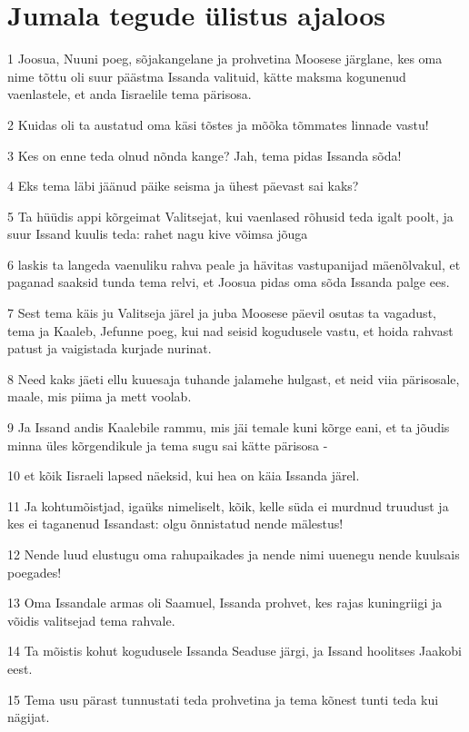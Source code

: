 \section*{Jumala tegude ülistus ajaloos}

\par 1 Joosua, Nuuni poeg, sõjakangelane ja prohvetina Moosese järglane, kes oma nime tõttu oli suur päästma Issanda valituid, kätte maksma kogunenud vaenlastele, et anda Iisraelile tema pärisosa.
\par 2 Kuidas oli ta austatud oma käsi tõstes ja mõõka tõmmates linnade vastu!
\par 3 Kes on enne teda olnud nõnda kange? Jah, tema pidas Issanda sõda!
\par 4 Eks tema läbi jäänud päike seisma ja ühest päevast sai kaks?
\par 5 Ta hüüdis appi kõrgeimat Valitsejat, kui vaenlased rõhusid teda igalt poolt, ja suur Issand kuulis teda: rahet nagu kive võimsa jõuga
\par 6 laskis ta langeda vaenuliku rahva peale ja hävitas vastupanijad mäenõlvakul, et paganad saaksid tunda tema relvi, et Joosua pidas oma sõda Issanda palge ees.
\par 7 Sest tema käis ju Valitseja järel ja juba Moosese päevil osutas ta vagadust, tema ja Kaaleb, Jefunne poeg, kui nad seisid kogudusele vastu, et hoida rahvast patust ja vaigistada kurjade nurinat.
\par 8 Need kaks jäeti ellu kuuesaja tuhande jalamehe hulgast, et neid viia pärisosale, maale, mis piima ja mett voolab.
\par 9 Ja Issand andis Kaalebile rammu, mis jäi temale kuni kõrge eani, et ta jõudis minna üles kõrgendikule ja tema sugu sai kätte pärisosa -
\par 10 et kõik Iisraeli lapsed näeksid, kui hea on käia Issanda järel.
\par 11 Ja kohtumõistjad, igaüks nimeliselt, kõik, kelle süda ei murdnud truudust ja kes ei taganenud Issandast: olgu õnnistatud nende mälestus!
\par 12 Nende luud elustugu oma rahupaikades ja nende nimi uuenegu nende kuulsais poegades!
\par 13 Oma Issandale armas oli Saamuel, Issanda prohvet, kes rajas kuningriigi ja võidis valitsejad tema rahvale.
\par 14 Ta mõistis kohut kogudusele Issanda Seaduse järgi, ja Issand hoolitses Jaakobi eest.
\par 15 Tema usu pärast tunnustati teda prohvetina ja tema kõnest tunti teda kui nägijat.
